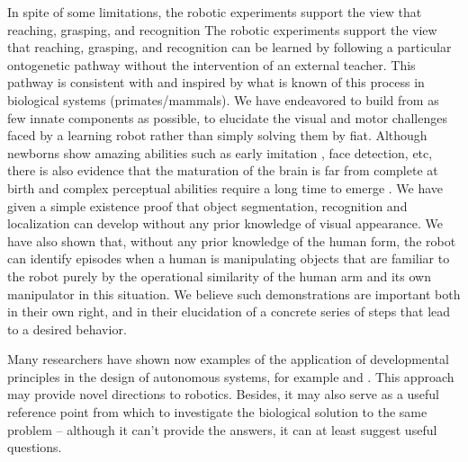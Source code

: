 \ifrev
In spite of some limitations, the robotic experiments support the view that reaching, grasping, and recognition
\else
The robotic experiments support the view that reaching, grasping, and recognition
\fi
can be learned by following a particular ontogenetic pathway without the
intervention of an external teacher.
This pathway is consistent with and inspired by what is
known of this process in biological systems (primates/mammals).
%
We have endeavored to build from as few innate components as possible, to
elucidate the visual and motor challenges faced by a learning robot rather
than simply solving them by fiat.
%
Although newborns show amazing abilities \cite{spelke-2000} such as early imitation 
\cite{meltzoff-moore-1977}, face detection, etc, there is also evidence 
that the maturation of the brain is far from complete at birth and
complex perceptual abilities require a long time to emerge \cite{kovacs00human}.
%
We have given a simple existence proof that object segmentation,
recognition and localization can develop without any prior knowledge
of visual appearance.  We have also shown that, without any prior
knowledge of the human form, the robot can identify episodes when a
human is manipulating objects that are familiar to the robot purely by
the operational similarity of the human arm and its own manipulator in
this situation.  We believe such demonstrations are important both in
their own right, and in their elucidation of a concrete series of
steps that lead to a desired behavior.  

Many researchers have shown now examples of the application of developmental
principles in the design of autonomous systems, for example \cite{weng-2000, weng-2002} 
and \cite{metta99developmental}. This approach may provide novel
directions to robotics. Besides, it may also serve as a useful
reference point from which to investigate the biological solution to
the same problem -- although it can't provide the answers, it can at
least suggest useful questions.

%



